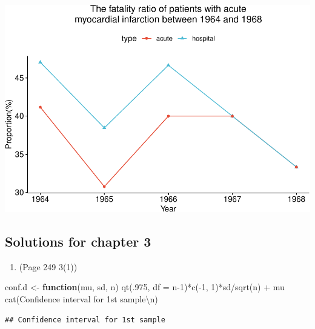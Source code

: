 \documentclass{article}
\newenvironment{Shaded}{\begin{snugshade}}{\end{snugshade}}
\newcommand{\AttributeTok}[1]{\textcolor[rgb]{0.77,0.63,0.00}{#1}}
\newcommand{\ControlFlowTok}[1]{\textcolor[rgb]{0.13,0.29,0.53}{\textbf{#1}}}
\newcommand{\DecValTok}[1]{\textcolor[rgb]{0.00,0.00,0.81}{#1}}
\newcommand{\FunctionTok}[1]{\textcolor[rgb]{0.00,0.00,0.00}{#1}}
\newcommand{\NormalTok}[1]{#1}
\newcommand{\OtherTok}[1]{\textcolor[rgb]{0.56,0.35,0.01}{#1}}
\newcommand{\SpecialCharTok}[1]{\textcolor[rgb]{0.00,0.00,0.00}{#1}}
\newcommand{\StringTok}[1]{\textcolor[rgb]{0.31,0.60,0.02}{#1}}
\begin{document}
\includegraphics{Reference_solutions_files/figure-latex/unnamed-chunk-4-2.pdf}

\hypertarget{solutions-for-chapter-3}{%
\subsection{Solutions for chapter 3}\label{solutions-for-chapter-3}}

\begin{enumerate}
\def\labelenumi{\arabic{enumi}.}
\tightlist
\item
  (Page 249 3(1))
\end{enumerate}

\begin{Shaded}
\begin{Highlighting}[]
\NormalTok{conf.d }\OtherTok{\textless{}{-}} \ControlFlowTok{function}\NormalTok{(mu, sd, n) }\FunctionTok{qt}\NormalTok{(.}\DecValTok{975}\NormalTok{, }\AttributeTok{df =}\NormalTok{ n}\DecValTok{{-}1}\NormalTok{)}\SpecialCharTok{*}\FunctionTok{c}\NormalTok{(}\SpecialCharTok{{-}}\DecValTok{1}\NormalTok{, }\DecValTok{1}\NormalTok{)}\SpecialCharTok{*}\NormalTok{sd}\SpecialCharTok{/}\FunctionTok{sqrt}\NormalTok{(n) }\SpecialCharTok{+}\NormalTok{ mu}
\FunctionTok{cat}\NormalTok{(}\StringTok{\textquotesingle{}Confidence interval for 1st sample}\SpecialCharTok{\textbackslash{}n}\StringTok{\textquotesingle{}}\NormalTok{)}
\end{Highlighting}
\end{Shaded}

\begin{verbatim}
## Confidence interval for 1st sample
\end{verbatim}
\end{document}
